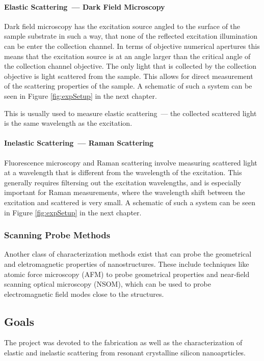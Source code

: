             \paragraph{Elastic Scattering~--- Dark Field Microscopy}
                    Dark field microscopy has the excitation source angled to the surface of the sample substrate in such a way, that none of
                the reflected excitation illumination can be enter the collection channel. In terms of objective numerical apertures this
                means that the excitation source is at an angle larger than the critical angle of the collection channel objective. The only
                light that is collected by the collection objective is light scattered from the sample. This allows for direct measurement of
                the scattering properties of the sample. A schematic of such a system can be seen in Figure \ref{fig:expSetup} in the next chapter.

                    This is usually used to measure elastic scattering~--- the collected scattered light is the same wavelength as the excitation.
            \paragraph{Inelastic Scattering~--- Raman Scattering}
                    Fluorescence microscopy and Raman scattering involve measuring scattered light at a wavelength that is different from the
                wavelength of the excitation. This generally requires filtersing out the excitation wavelengths, and is especially
                important for Raman measurements, where the wavelength shift between the excitation and scattered is very small.
                A schematic of such a system can be seen in Figure \ref{fig:expSetup} in the next chapter.

        \subsubsection{Scanning Probe Methods}
        \label{sec:SPM}
                Another class of characterization methods exist that can probe the geometrical and eletromagnetic properties of nanostructures.
            These include techniques like atomic force microscopy (AFM) to probe geometrical properties and near-field scanning
            optical microscopy (NSOM), which can be used to probe electromagnetic field modes close to the structures.

    \subsection{Goals}
            The project was devoted to the fabrication as well as the characterization of elastic and inelastic scattering from resonant crystalline
        silicon nanoaprticles.

